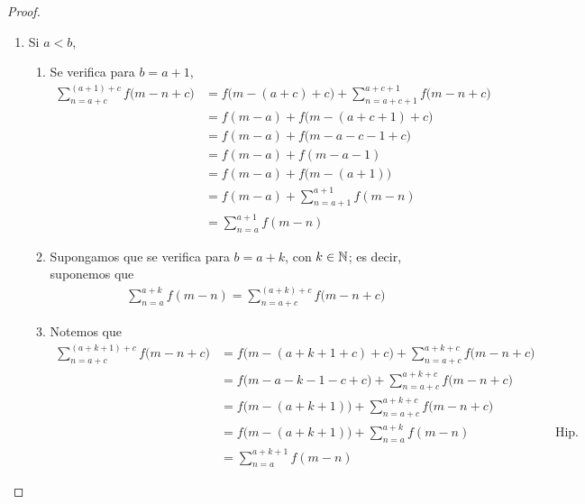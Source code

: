\begin{enumerate}[label=\alph*)]
\begin{proof}
\begin{enumerate}[label=\roman*)]
    \item Si $a<b$,
    \begin{enumerate}[label=\roman*)]
      \item Se verifica para $b=a+1$,
      \begin{align*}
        \sum_{n=a+c}^{(a+1)+c} f\bigl(m-n+c\bigr) &= f\bigl(m-(a+c)+c\bigr) + \sum_{n=a+c+1}^{a+c+1} f\bigl(m-n+c\bigr)\\
        &= f(m-a) + f\bigl(m-(a+c+1)+c\bigr)\\
        &= f(m-a) + f\bigl(m-a-c-1+c\bigr)\\
        &= f(m-a) + f(m-a-1)\\
        &= f(m-a) + f\bigl(m-(a+1)\bigr)\\
        &= f(m-a) + \sum_{n=a+1}^{a+1} f(m-n)\\
        &= \sum_{n=a}^{a+1} f(m-n)
      \end{align*}

      \item Supongamos que se verifica para $b=a+k$, con $k\in \mathbb{N}$; es decir, suponemos que
      \begin{align*}
        \sum_{n=a}^{a+k} f(m-n) = \sum_{n=a+c}^{(a+k)+c} f\bigl(m-n+c\bigr)
      \end{align*}

      \item Notemos que
      \begin{align*}
        \sum_{n=a+c}^{(a+k+1)+c} f\bigl(m-n+c\bigr) &= f\bigl(m-(a+k+1+c)+c\bigr) + \sum_{n=a+c}^{a+k+c} f\bigl(m-n+c\bigr)\\
        &= f\bigl(m-a-k-1-c+c\bigr) + \sum_{n=a+c}^{a+k+c} f\bigl(m-n+c\bigr)\\
        &= f\bigl(m-(a+k+1)\bigr)+ \sum_{n=a+c}^{a+k+c} f\bigl(m-n+c\bigr)\\
        &= f\bigl(m-(a+k+1)\bigr) + \sum_{n=a}^{a+k} f(m-n) && \text{Hip. Ind.}\\
        &= \sum_{n=a}^{a+k+1} f(m-n)
      \end{align*}
    \end{enumerate}
  \end{enumerate}
  \end{proof}


\end{enumerate}
